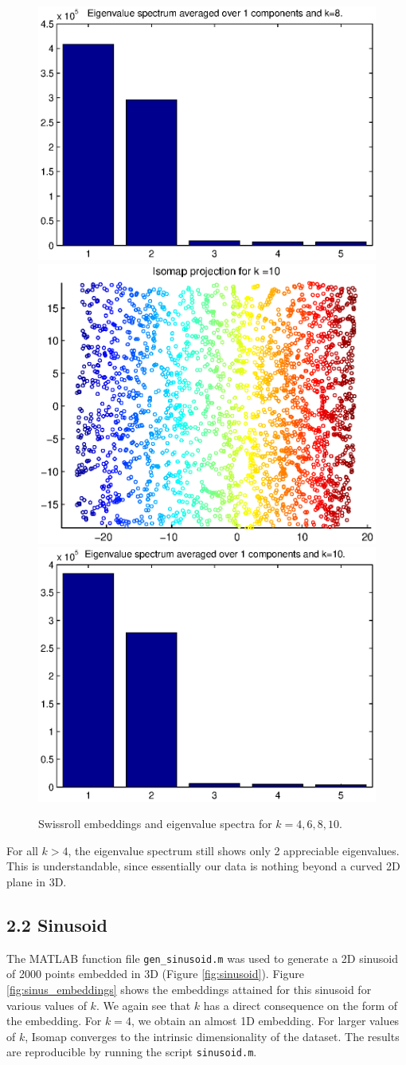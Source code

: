 \documentclass[a4paper,12pt]{report}
\begin{document}
\begin{figure}
\includegraphics[width = .4\textwidth]{figures/swissroll_barplot_k=8}\\ 
\includegraphics[width = .4\textwidth]{figures/swissroll_embedding_k=10}
\includegraphics[width = .4\textwidth]{figures/swissroll_barplot_k=10}\\ 
\caption{Swissroll embeddings and eigenvalue spectra for $k=4, 6, 8,  10$.}
\label{fig:swiss_embeddings}
\end{figure}

For all $k > 4$, the eigenvalue spectrum still shows only 2 appreciable eigenvalues. This is understandable, since essentially our data
is nothing beyond a curved 2D plane in 3D.

\subsection*{2.2 Sinusoid}

The MATLAB function file \texttt{gen\_sinusoid.m} was used to generate a 2D sinusoid of 2000 points embedded in 3D (Figure \ref{fig:sinusoid}).  Figure 
\ref{fig:sinus_embeddings} shows the embeddings attained for this sinusoid for various values of $k$. We again see that $k$ has a direct consequence
on the form of the embedding. For $k=4$, we obtain an almost 1D embedding. For larger values of $k$, Isomap converges to the intrinsic dimensionality 
of the dataset. The results are reproducible by running the script \texttt{sinusoid.m}.
\end{document}
